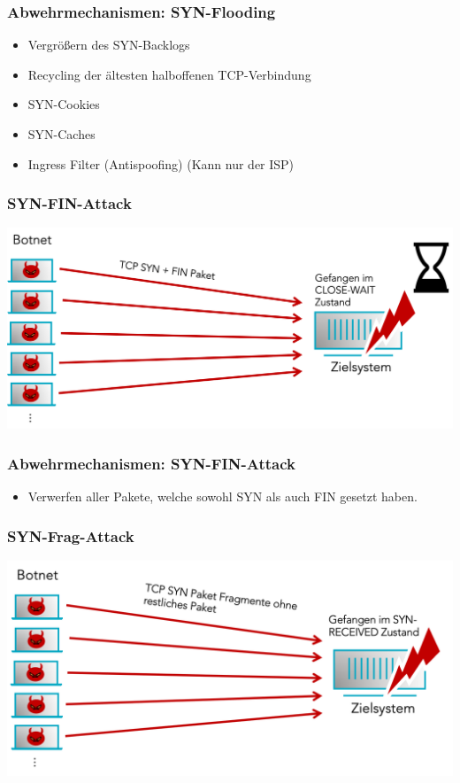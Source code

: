 \documentclass{beamer}
\begin{document}
\begin{frame}
	\frametitle{Abwehrmechanismen: SYN-Flooding}
	\begin{itemize}
		\item Vergrößern des SYN-Backlogs
		\item Recycling der ältesten halboffenen TCP-Verbindung
		\item SYN-Cookies %
		\item SYN-Caches %
		\item Ingress Filter (Antispoofing) (Kann nur der ISP)
	\end{itemize}
\end{frame}

\begin{frame}
	\frametitle{SYN-FIN-Attack}
	\begin{center}
		\includegraphics[width=0.9\linewidth]{img/9}
	\end{center}
\end{frame}

\begin{frame}
	\frametitle{Abwehrmechanismen: SYN-FIN-Attack}
	\begin{itemize}
		\item Verwerfen aller Pakete, welche sowohl SYN als auch FIN gesetzt haben.
	\end{itemize}
\end{frame}

\begin{frame}
	\frametitle{SYN-Frag-Attack }
	\begin{center}
		\includegraphics[width=0.9\linewidth]{img/syn}
	\end{center}
\end{frame}
\end{document}
